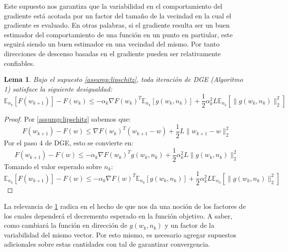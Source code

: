 \documentclass{book}
\theoremstyle{plain}
\newtheorem{lem}[thm]{Lema}
\theoremstyle{definition}
\theoremstyle{remark}
\begin{document}
Este supuesto nos garantiza que la variabilidad en el comportamiento del gradiente está acotada por un factor del tamaño de la vecindad en la cual el gradiente es evaluado. En otras palabras, si el gradiente resulta ser un buen estimador del comportamiento de una función en un punto en partiular, este seguirá siendo un buen estimador en una vecindad del mismo. Por tanto direcciones de descenso basadas en el gradiente pueden ser relativamente confiables.

\begin{lem}\label{lem:markov}
Bajo el supuesto \ref{assump:lipschitz}, toda iteración de DGE (Algoritmo 1) satisface la siguiente desigualdad:
\begin{equation}
    \mathbb{E}_{n_k}[F(w_{k+1})] - F(w_{k}) \leq -\alpha_k\nabla F(w_{k})^T\mathbb{E}_{n_k}[g(w_{k}, n_{k})]+\frac{1}{2}\alpha^2_kL\mathbb{E}_{n_k}[\|g(w_{k}, n_{k})\|_2^2]
\end{equation}
\end{lem}

\begin{proof}

Por \ref{assump:lipschitz} sabemos que:
\begin{equation*}
    F(w_{k+1}) - F(w) \leq  \nabla F(w_{k})^T(w_{k+1}- w) + \frac{1}{2}L\|w_{k+1} - w\|_2^2
\end{equation*}
Por el paso 4 de DGE, esto se convierte en:
\begin{equation*}
    F(w_{k+1}) - F(w) \leq  -\alpha_k\nabla F(w_k)^Tg(w_k, n_k) + \frac{1}{2}\alpha_k^2L\|g(w_k, n_k)\|_2^2
\end{equation*}
Tomando el valor esperado sobre $n_k$:
\begin{equation*}
    \mathbb{E}_{n_k}[F(w_{k+1})] - F(w) \leq  - \alpha_k\nabla F(w)^T\mathbb{E}_{n_k}[g(w_k, n_k)] + \frac{1}{2}\alpha_k^2L\mathbb{E}_{n_k}[\|g(w_k, n_k)\|_2^2]
\end{equation*}
\end{proof}

La relevancia de \ref{lem:markov} radica en el hecho de que nos da una noción de los factores de los cuales dependerá el decremento esperado en la función objetivo. A saber, como cambiará la función en dirección de $g(w_k, n_k)$ y un factor de la variabilidad del mismo vector. Por esto mismo, es necesario agregar supuestos adicionales sobre estas cantidades con tal de garantizar convergencia.
\end{document}
